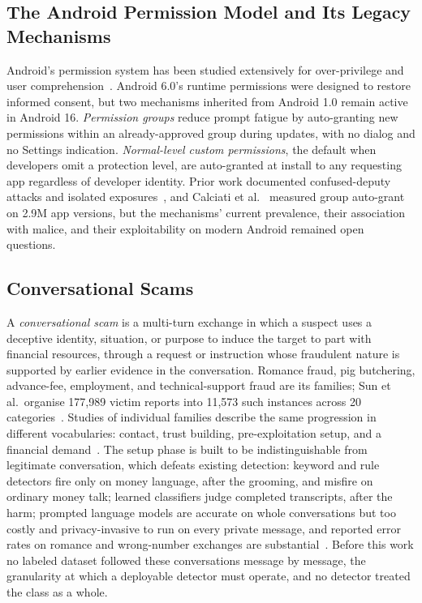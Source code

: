 \documentclass[letterpaper,11pt]{article}
\begin{document}
\subsection{The Android Permission Model and Its Legacy Mechanisms}
Android's permission system has been studied extensively for
over-privilege and user
comprehension~\cite{felt2011demystified,felt2012attention,wijesekera2015remystified}.
Android 6.0's runtime permissions were designed to restore informed
consent, but two mechanisms inherited from Android 1.0 remain active
in Android 16. \emph{Permission groups} reduce prompt fatigue by
auto-granting new permissions within an already-approved group during
updates, with no dialog and no Settings indication. \emph{Normal-level
custom permissions}, the default when developers omit a protection
level, are auto-granted at install to any requesting app regardless of
developer identity. Prior work documented confused-deputy attacks and
isolated exposures~\cite{tuncay2018custom,gamba2020preinstalled}, and
Calciati et al.~\cite{calciati2020automatically} measured group
auto-grant on 2.9M app versions, but the mechanisms' current
prevalence, their association with malice, and their exploitability on
modern Android remained open questions.

\subsection{Conversational Scams}
A \emph{conversational scam} is a multi-turn exchange in which a
suspect uses a deceptive identity, situation, or purpose to induce the
target to part with financial resources, through a request or
instruction whose fraudulent nature is supported by earlier evidence in
the conversation. Romance fraud, pig butchering, advance-fee,
employment, and technical-support fraud are its families; Sun et
al.\ organise 177,989 victim reports into 11,573 such instances across
20 categories~\cite{sun2026prescam}. Studies of individual families
describe the same progression in different vocabularies: contact,
trust building, pre-exploitation setup, and a financial
demand~\cite{whitty2013scammers,oak2025anna,acharya2024explorative,spokoyny2025victim}.
The setup phase is built to be indistinguishable from legitimate
conversation, which defeats existing detection: keyword and rule
detectors fire only on money language, after the grooming, and misfire
on ordinary money talk; learned classifiers judge completed
transcripts, after the harm; prompted language models are accurate on
whole conversations but too costly and privacy-invasive to run on every
private message, and reported error rates on romance and wrong-number
exchanges are substantial~\cite{lu2026readthis,topcuoglu2026genai}.
Before this work no labeled dataset followed these conversations
message by message, the granularity at which a deployable detector
must operate, and no detector treated the class as a whole.
\end{document}
